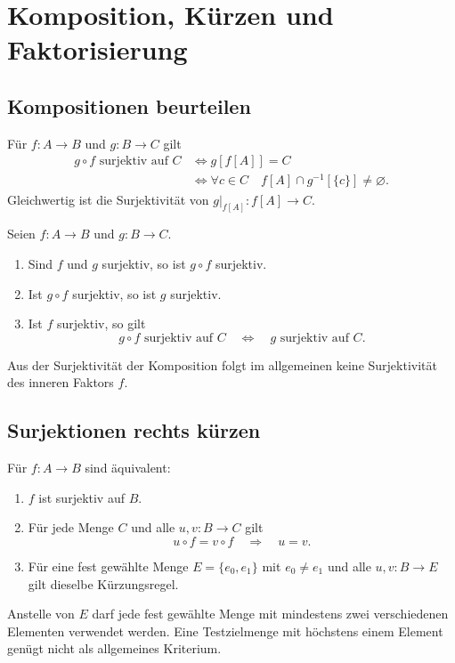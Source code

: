 \chapter{Komposition, Kürzen und Faktorisierung}
\label{b07guide:ch:composition}

\section{Kompositionen beurteilen}

\begin{theorem}
\label{b07guide:thm:composition}
Für $f\colon A\to B$ und $g\colon B\to C$ gilt
\[
 \begin{aligned}
 g\circ f\text{ surjektiv auf }C
 &\Longleftrightarrow g[f[A]]=C\\
 &\Longleftrightarrow
   \forall c\in C\quad f[A]\cap g^{-1}[\{c\}]\ne\varnothing.
 \end{aligned}
\]
Gleichwertig ist die Surjektivität von
$g|_{f[A]}\colon f[A]\to C$.
\end{theorem}

\begin{theorem}
\label{b07guide:thm:factors}
Seien $f\colon A\to B$ und $g\colon B\to C$.
\begin{enumerate}
\item Sind $f$ und $g$ surjektiv, so ist $g\circ f$ surjektiv.
\item Ist $g\circ f$ surjektiv, so ist $g$ surjektiv.
\item Ist $f$ surjektiv, so gilt
\[
 g\circ f\text{ surjektiv auf }C
 \quad\Longleftrightarrow\quad
 g\text{ surjektiv auf }C.
\]
\end{enumerate}
Aus der Surjektivität der Komposition folgt im allgemeinen
keine Surjektivität des inneren Faktors $f$.
\end{theorem}

\section{Surjektionen rechts kürzen}

\begin{theorem}
\label{b07guide:thm:cancellation}
Für $f\colon A\to B$ sind äquivalent:
\begin{enumerate}
\item $f$ ist surjektiv auf $B$.
\item Für jede Menge $C$ und alle $u,v\colon B\to C$ gilt
\[
 u\circ f=v\circ f\quad\Longrightarrow\quad u=v.
\]
\item Für eine fest gewählte Menge $E=\{e_0,e_1\}$ mit
      $e_0\ne e_1$ und alle $u,v\colon B\to E$
      gilt dieselbe Kürzungsregel.
\end{enumerate}
Anstelle von $E$ darf jede fest gewählte Menge mit mindestens
zwei verschiedenen Elementen verwendet werden.
Eine Testzielmenge mit höchstens einem Element genügt nicht
als allgemeines Kriterium.
\end{theorem}

